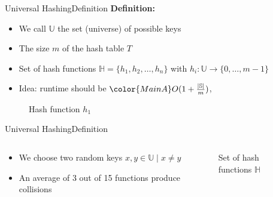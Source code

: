 
\begin{frame}{Universal Hashing}{Definition}
  \textbf{Definition:}
  \begin{itemize}
    \item<1->
      We call {\color{MainA}$\mathbb{U}$} the set (universe) of
      possible keys
    \item<2->
      The size {\color{MainA}$m$} of the hash table {\color{MainA}$T$}
    \item<3->
      Set of hash functions
      {\color{MainA}$\mathbb{H} = \{h_1, h_2,\dots, h_n\}$} with
      {\color{MainA}$h_i: \mathbb{U} \to \{0,\dots, m - 1\}$}
    \item<5-> Idea: runtime should be
      $\color{MainA} O(1+\frac{\vert \mathbb{S}\vert}{m})$,
  \end{itemize}%
  \begin{figure}[!b]%
    \begin{adjustbox}{height=0.32\linewidth}%
    \end{adjustbox}
    \vspace*{-1.0em}%
    \caption{Hash function $h_1$}%
    \label{fig:universal_hashing:hash_function_definition}
  \end{figure}
\end{frame}


\begin{frame}{Universal Hashing}{Definition}
  \begin{columns}
    \begin{column}{0.5\linewidth}
      \begin{itemize}
        \item<1->
          We choose two random keys
          {\color{MainA}$x, y \in \mathbb{U} \mid x \neq y$}
        \item<2->
          An average of 3 out of 15 functions produce collisions
      \end{itemize}
    \end{column}
    \begin{column}{0.5\linewidth}
      \begin{figure}[!t]%
        \begin{adjustbox}{width=\linewidth}
        \end{adjustbox}
        \caption{Set of hash functions $\mathbb{H}$}%
        \label{fig:universal_hashing:hash_universe}
      \end{figure}
    \end{column}
  \end{columns}
\end{frame}

